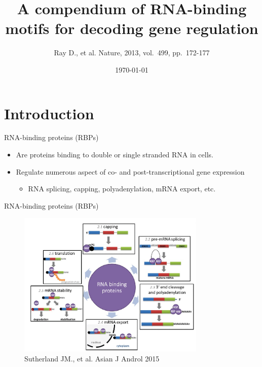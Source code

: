 \documentclass[professionalfont, 12pt, default]{beamer}
\title{A compendium of RNA-binding motifs for decoding gene regulation}
\author{Ray D., et al. Nature, 2013, vol.~499, pp.~172-177}
\date{\today}
\providecommand{\tightlist}{%
    \setlength{\itemsep}{0pt}\setlength{\parskip}{0pt}}
\begin{document}
\frame{\titlepage}

\section{Introduction}\label{introduction}

\begin{frame}{RNA-binding proteins (RBPs)}

\begin{itemize}
\tightlist
\item
  Are proteins binding to double or single stranded RNA in cells.
\item
  Regulate numerous aspect of co- and post-transcriptional gene
  expression

  \begin{itemize}
  \tightlist
  \item
    RNA splicing, capping, polyadenylation, mRNA export, etc.
  \end{itemize}
\end{itemize}

\end{frame}

\begin{frame}{RNA-binding proteins (RBPs)}

\begin{figure}
\centering
\includegraphics[width=0.80000\textwidth]{img/RBPs1.jpg}
\caption{Sutherland JM., et al. Asian J Androl 2015}
\end{figure}

\end{frame}
\end{document}
